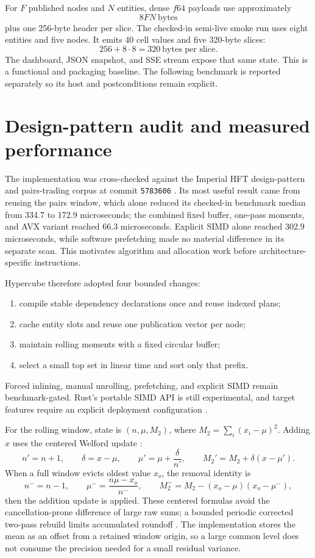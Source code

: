 \documentclass{strategynet-journal}
\begin{document}
For \(F\) published nodes and \(N\) entities, dense \(f64\) payloads use
approximately
\[
  8FN\ \text{bytes}
\]
plus one 256-byte header per slice.  The checked-in semi-live smoke run uses
eight entities and five nodes.  It emits 40 cell values and five 320-byte
slices:
\[
  256 + 8\cdot 8 = 320\ \text{bytes per slice}.
\]
The dashboard, JSON snapshot, and SSE stream expose that same state.  This is
a functional and packaging baseline.  The following benchmark is reported
separately so its host and postconditions remain explicit.

\section{Design-pattern audit and measured performance}

The implementation was cross-checked against the Imperial HFT design-pattern
and pairs-trading corpus at commit \texttt{5783606} \cite{imperial}.  Its most
useful result came from reusing the pairs window, which alone
reduced its checked-in benchmark median from 334.7 to 172.9 microseconds; the
combined fixed buffer, one-pass moments, and AVX variant reached 66.3
microseconds.  Explicit SIMD alone reached 302.9 microseconds, while software
prefetching made no material difference in its separate scan.  This motivates
algorithm and allocation work before architecture-specific instructions.

Hypercube therefore adopted four bounded changes:
\begin{enumerate}
  \item compile stable dependency declarations once and reuse indexed plans;\par
  \item cache entity slots and reuse one publication vector per node;\par
  \item maintain rolling moments with a fixed circular buffer;\par
  \item select a small top set in linear time and sort only that prefix.\par
\end{enumerate}
Forced inlining, manual unrolling, prefetching, and explicit SIMD remain
benchmark-gated.  Rust's portable SIMD API is still experimental, and target
features require an explicit deployment configuration \cite{rustsimd,rusttarget}.

For the rolling window, state is \((n,\mu,M_2)\), where
\(M_2=\sum_i(x_i-\mu)^2\).  Adding \(x\) uses the centered Welford update
\cite{welford}:
\[
  n'=n+1,\qquad
  \delta=x-\mu,\qquad
  \mu'=\mu+\frac{\delta}{n'},\qquad
  M_2'=M_2+\delta(x-\mu').
\]
When a full window evicts oldest value \(x_o\), the removal identity is
\[
  n^-=n-1,\qquad
  \mu^-=\frac{n\mu-x_o}{n^-},\qquad
  M_2^-=M_2-(x_o-\mu)(x_o-\mu^-),
\]
then the addition update is applied.  These centered formulas avoid the
cancellation-prone difference of large raw sums; a bounded periodic corrected
two-pass rebuild limits accumulated roundoff \cite{chanvariance}.  The
implementation stores the mean as an offset from a retained window origin, so
a large common level does not consume the precision needed for a small
residual variance.
\end{document}
